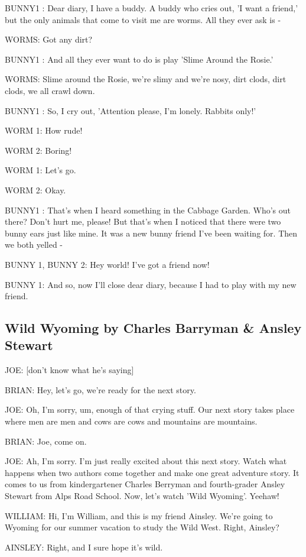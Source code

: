 BUNNY1 :
Dear diary, I have a buddy.
A buddy who cries out, 'I want a friend,' but the only animals that come to visit me are worms.
All they ever ask is -

WORMS:
Got any dirt?

BUNNY1 :
And all they ever want to do is play 'Slime Around the Rosie.'

WORMS:
Slime around the Rosie,
we're slimy and we're nosy,
dirt clods, dirt clods, we all crawl down.

BUNNY1 :
So, I cry out, 'Attention please, I'm lonely. Rabbits only!'

WORM 1:
How rude!

WORM 2:
Boring!

WORM 1:
Let's go.

WORM 2:
Okay.

BUNNY1 :
That's when I heard something in the Cabbage Garden.
Who's out there?
Don't hurt me, please!
But that's when I noticed that there were two bunny ears just like mine.
It was a new bunny friend I've been waiting for.
Then we both yelled -

BUNNY 1, BUNNY 2:
Hey world!
I've got a friend now!

BUNNY 1:
And so, now I'll close dear diary, because I had to play with my new friend.

\subsection{Wild Wyoming by Charles Barryman \& Ansley Stewart}

JOE:
[don't know what he's saying]

BRIAN:
Hey, let's go, we're ready for the next story.

JOE:
Oh, I'm sorry, um, enough of that crying stuff.
Our next story takes place where men are men and cows are cows and mountains are mountains.

BRIAN:
Joe, come on.

JOE:
Ah, I'm sorry.
I'm just really excited about this next story.
Watch what happens when two authors come together and make one great adventure story.
It comes to us from kindergartener Charles Berryman and fourth-grader Ansley Stewart from Alps Road School.
Now, let's watch 'Wild Wyoming'.
Yeehaw!

WILLIAM:
Hi, I'm William, and this is my friend Ainsley.
We're going to Wyoming for our summer vacation to study the Wild West.
Right, Ainsley?

AINSLEY:
Right, and I sure hope it's wild.

